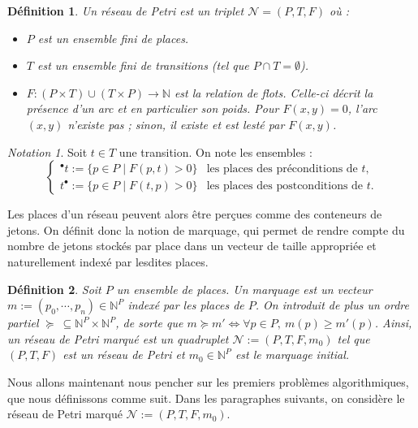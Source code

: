 \documentclass{article}
\newtheorem{definition}{Définition}
\theoremstyle{remark}
\theoremstyle{remark}
\newtheorem*{notation}{Notation}
\newcommand{\preb}[1]{{}^\bullet #1}
\newcommand{\postb}[1]{#1^\bullet}
\newcommand{\prototype}[3]{#1 : #2 \rightarrow #3}
\begin{document}
\begin{definition}
    Un réseau de Petri est un triplet $\mathcal{N} = (P, T, F)$ où :
    \begin{itemize}
        \item $P$ est un ensemble fini de places.
        \item $T$ est un ensemble fini de transitions (tel que $P \cap T = \emptyset$).
        \item $\prototype{F}{(P \times T) \cup (T \times P)}{\mathbb{N}}$ est la relation de flots. Celle-ci décrit la présence d'un arc et en particulier son poids. Pour $F(x, y) = 0$, l'arc $(x, y)$ n'existe pas ; sinon, il existe et est lesté par $F(x, y)$.
    \end{itemize}
\end{definition}

\begin{notation}
    Soit $t \in T$ une transition. On note les ensembles : \begin{equation*}
        \begin{cases}
            \preb{t}  := \{p \in P \mid F(p, t) > 0\} & \text{les places des préconditions de } t, \\
            \postb{t} := \{p \in P \mid F(t, p) > 0\} & \text{les places des postconditions de } t.
        \end{cases}
    \end{equation*}
\end{notation}

Les places d'un réseau peuvent alors être perçues comme des conteneurs de jetons. On définit donc la notion de marquage, qui permet de rendre compte du nombre de jetons stockés par place dans un vecteur de taille appropriée et naturellement indexé par lesdites places.

\begin{definition}
    Soit $P$ un ensemble de places. Un marquage est un vecteur $m := (p_0, \cdots, p_n) \in \mathbb{N}^P$ indexé par les places de $P$. On introduit de plus un ordre partiel $\succeq\ \subseteq \mathbb{N}^P \times \mathbb{N}^P$, de sorte que $m \succeq m' \Longleftrightarrow \forall p \in P,\ m(p) \geq m'(p)$. Ainsi, un réseau de Petri marqué est un quadruplet $\mathcal{N} := (P, T, F, m_0)$ tel que $(P, T, F)$ est un réseau de Petri et $m_0 \in \mathbb{N}^{P}$ est le marquage initial.
\end{definition}

Nous allons maintenant nous pencher sur les premiers problèmes algorithmiques, que nous définissons comme suit.
Dans les paragraphes suivants, on considère le réseau de Petri marqué $\mathcal{N} := (P, T, F, m_0)$.
\end{document}
